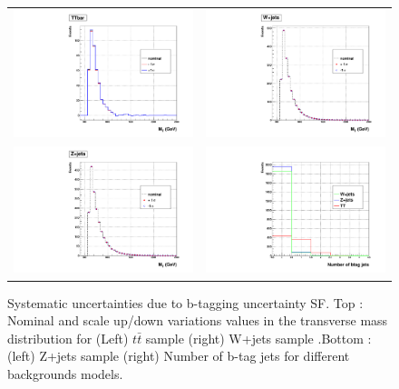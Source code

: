 \begin{figure}[!ht]
\caption{ Systematic uncertainties due to b-tagging uncertainty SF. Top : Nominal and scale up/down variations values in the transverse mass distribution for (Left) $t\bar{t}$ sample (right) W+jets sample .Bottom : (left) Z+jets sample (right)  Number of b-tag jets for different backgrounds models.}
\begin{tabular}{cc}
 \includegraphics[width=220pt]{figures/SystUncert/btagjetsTTjets.pdf} &
\includegraphics[width=220pt]{figures/SystUncert/btagjetsWjets.pdf}\\
 \includegraphics[width=220pt]{figures/SystUncert/btagjetsZjets.pdf} &
\includegraphics[width=220pt]{figures/SystUncert/Nbtagjetsback.pdf}\\
\end{tabular}
\label{fig:BTAGuncertback}
\end{figure}


